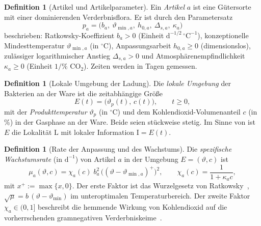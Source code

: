 \documentclass[a4paper, 12pt, twoside, openright]{report}
\theoremstyle{definition}
\newtheorem{definition}[theorem]{Definition}
\theoremstyle{definition}
\begin{document}
\begin{definition}[Artikel und Artikelparameter]\label{def:sb-artikel}
Ein \emph{Artikel} $a$ ist eine Gütersorte mit einer dominierenden Verderbnisflora. Er ist
durch den Parametersatz
\[
  p_a=\bigl(b_a,\ \vartheta_{\min,a},\ h_{0,a},\ \Delta_{s,a},\ \kappa_a\bigr)
\]
beschrieben: Ratkowsky-Koeffizient $b_a>0$ (Einheit $\mathrm{d}^{-1/2}\,{}^\circ\mathrm C^{-1}$),
konzeptionelle Mindesttemperatur $\vartheta_{\min,a}$ (in ${}^\circ$C), Anpassungsarbeit
$h_{0,a}\ge0$ (dimensionslos), zulässiger logarithmischer Anstieg $\Delta_{s,a}>0$ und
Atmosphärenempfindlichkeit $\kappa_a\ge0$ (Einheit $1/\%$ CO$_2$). Zeiten werden in Tagen
gemessen.
\end{definition}

\begin{definition}[Lokale Umgebung der Ladung]\label{def:sb-umgebung}
Die \emph{lokale Umgebung} der Bakterien an der Ware ist die zeitabhängige Größe
\[
  E(t)=\bigl(\vartheta_p(t),\,c(t)\bigr),\qquad t\ge0,
\]
mit der \emph{Produkttemperatur} $\vartheta_p$ (in ${}^\circ$C) und dem
Kohlendioxid-Volumenanteil $c$ (in \%) in der Gasphase an der Ware. Beide seien stückweise
stetig. Im Sinne von \cite{epp_bakterien} ist $E$ die Lokalität $\mathrm L$ mit lokaler
Information $\mathrm I=E(t)$.
\end{definition}

\begin{definition}[Rate der Anpassung und des Wachstums]\label{def:sb-rate}
Die \emph{spezifische Wachstumsrate} (in $\mathrm d^{-1}$) von Artikel $a$ in der Umgebung
$E=(\vartheta,c)$ ist
\begin{equation}
  \mu_a(\vartheta,c)=\chi_a(c)\;b_a^{2}\,\bigl((\vartheta-\vartheta_{\min,a})^{+}\bigr)^{2},
  \qquad \chi_a(c)=\frac{1}{1+\kappa_a c},
  \label{eq:sb-mu}
\end{equation}
mit $x^+:=\max\{x,0\}$. Der erste Faktor ist das Wurzelgesetz von
Ratkowsky~\cite{ratkowsky1982}, $\sqrt{\mu}=b\,(\vartheta-\vartheta_{\min})$ im
unteroptimalen Temperaturbereich. Der zweite Faktor $\chi_a\in(0,1]$ beschreibt die
hemmende Wirkung von Kohlendioxid auf die vorherrschenden gramnegativen
Verderbniskeime~\cite{mokhele1983,leroi2010}.
\end{definition}
\end{document}
